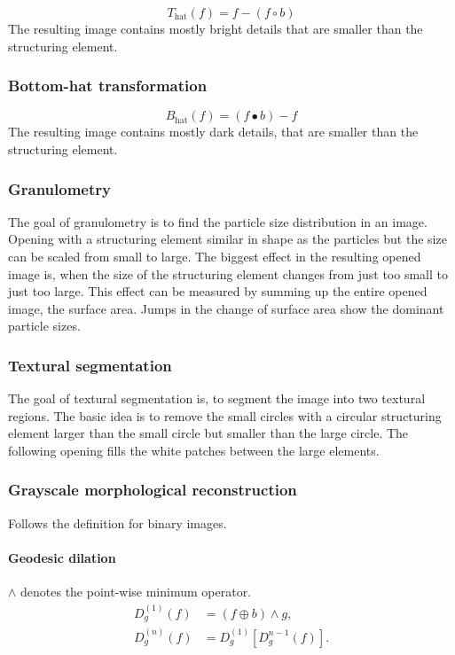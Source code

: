 \[
	T_\text{hat}(f) = f -(f \circ b)
\]
The resulting image contains mostly bright details that are smaller than the structuring element.

\subsubsection{Bottom-hat transformation}

\[
	B_\text{hat}(f) = (f \bullet b)-f
\]
The resulting image contains mostly dark details, that are smaller than the structuring element.

\subsubsection{Granulometry}

The goal of granulometry is to find the particle size distribution in an image. Opening with a structuring element similar in shape as the particles but the size can be scaled from small to large. The biggest effect in the resulting opened image is, when the size of the structuring element changes from just too small to just too large. This effect can be measured by summing up the entire opened image, the surface area. Jumps in the change of surface area show the dominant particle sizes.

\subsubsection{Textural segmentation}

The goal of textural segmentation is, to segment the image into two textural regions. The basic idea is to remove the small circles with a circular structuring element larger than the small circle but smaller than the large circle. The following opening fills the white patches between the large elements.

\subsubsection{Grayscale morphological reconstruction}

Follows the definition for binary images.

\paragraph{Geodesic dilation}
$\wedge$ denotes the point-wise minimum operator.
\begin{align*}
	D_g^{(1)}(f) &= (f\oplus b)\wedge g, \\
	D_g^{(n)}(f) &= D_g^{(1)}[D_g^{n-1}(f)].
\end{align*}

